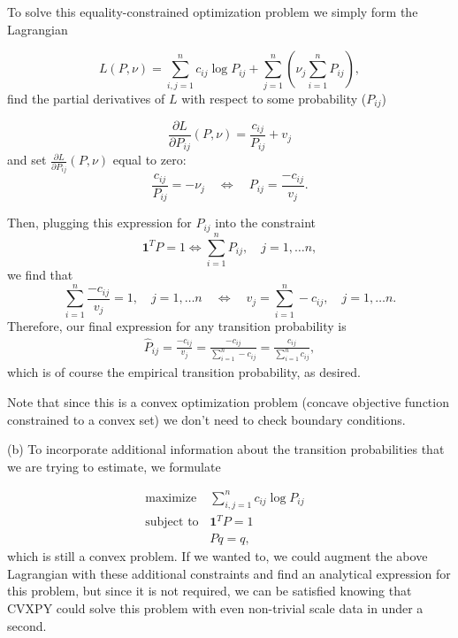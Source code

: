 \documentclass[12pt,reqno]{article}
\theoremstyle{definition}
\numberwithin{equation}{section}
\begin{document}
\noindent To solve this equality-constrained optimization problem we simply form the Lagrangian

\[L(P, \nu) = \sum_{i, j=1}^{n} c_{ij}\log P_{ij} + \sum_{j=1}^{n} \left(\nu_j \sum_{i=1}^{n}P_{ij} \right),\]
find the partial derivatives of $L$ with respect to some probability ($P_{ij}$)

\[\frac{\partial L}{\partial P_{ij}}(P, \nu) = \frac{c_{ij}}{P_{ij}} + v_{j}\]
and set $\frac{\partial L}{\partial P_{ij}}(P, \nu)$ equal to zero:
\[\frac{c_{ij}}{P_{ij}} = - \nu_j \quad \Longleftrightarrow \quad P_{ij} = \frac{-c_{ij}}{v_{j}}.\]

\noindent Then, plugging this expression for $P_{ij}$ into the constraint 
\[\bm{1}^T P = 1 \Longleftrightarrow \sum_{i=1}^{n}P_{ij}, \quad j = 1, \ldots n,\]
we find that
\[\sum_{i=1}^{n}\frac{-c_{ij}}{v_{j}} = 1, \quad j= 1, \ldots n \quad \Longleftrightarrow \quad v_j = \sum_{i=1}^{n}-c_{ij}, \quad j = 1, \ldots n.\]
Therefore, our final expression for any transition probability is
\[\begin{aligned}
    \hat{P}_{ij} = \frac{-c_{ij}}{v_{j}} = \frac{-c_{ij}}{\sum_{i=1}^{n}-c_{ij}} = \frac{c_{ij}}{\sum_{i=1}^{n}c_{ij}},
\end{aligned}\]
which is of course the empirical transition probability, as desired.

\noindent Note that since this is a convex optimization problem (concave objective function constrained to a convex set)
we don't need to check boundary conditions.

\vspace{0.1cm}
\noindent (b) To incorporate additional information about the transition probabilities that we are trying to estimate,
we formulate

\[\begin{array}{lll}
    \text{maximize} \; & \sum_{i, j=1}^{n} c_{ij}\log P_{ij} & \\
    \text{subject to} & \bm{1}^T P = 1 & \\
    & Pq = q,
    \end{array}\]
which is still a convex problem. If we wanted to, we could augment the above Lagrangian with
these additional constraints and find an analytical expression for this problem, but since it is not
required, we can be satisfied knowing that CVXPY could solve this problem with even non-trivial scale data
in under a second.
\end{document}

